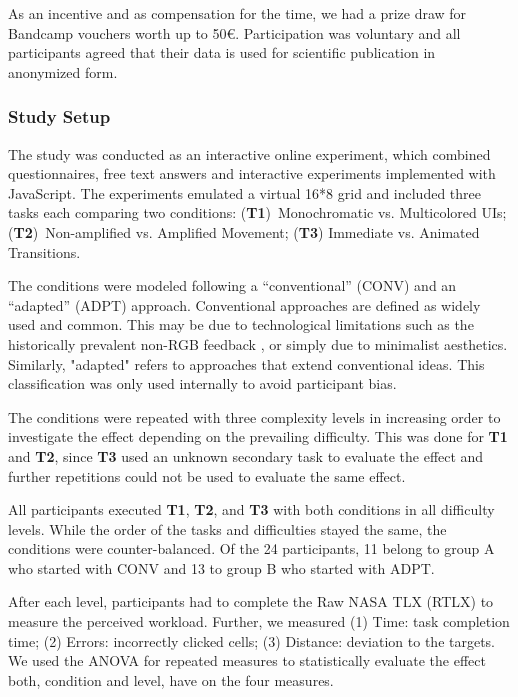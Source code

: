 \documentclass[sigconf]{nimeart}
\begin{document}
As an incentive and as compensation for the time, we had a prize draw for Bandcamp vouchers worth up to 50€. Participation was voluntary and all participants agreed that their data is used for scientific publication in anonymized form.

\subsubsection{Study Setup}\label{study-setup}

The study was conducted as an interactive online experiment, which combined questionnaires, free text answers and interactive experiments implemented with JavaScript. The experiments emulated a virtual 16*8 grid and included three tasks each comparing two conditions: (\textbf{T1})~Monochromatic vs. Multicolored UIs; (\textbf{T2})~Non-amplified vs. Amplified Movement; (\textbf{T3}) Immediate vs. Animated Transitions.

The conditions were modeled following a ``conventional'' (CONV) and an ``adapted'' (ADPT) approach. Conventional approaches are defined as widely used and common. This may be due to technological limitations such as the historically prevalent non-RGB feedback \cite{Rossmy2021Musical}, or simply due to minimalist aesthetics. Similarly, "adapted" refers to approaches that extend conventional ideas. This classification was only used internally to avoid participant bias.

The conditions were repeated with three complexity levels in increasing order to investigate the effect depending on the prevailing difficulty. This was done for \textbf{T1} and \textbf{T2}, since \textbf{T3} used an unknown secondary task to evaluate the effect and further repetitions could not be used to evaluate the same effect.

All participants executed \textbf{T1}, \textbf{T2}, and \textbf{T3} with both conditions in all difficulty levels. While the order of the tasks and difficulties stayed the same, the conditions were counter-balanced. Of the 24 participants, 11 belong to group A who started with CONV and 13 to group B who started with ADPT.

After each level, participants had to complete the Raw NASA TLX (RTLX) \cite{hart2006nasa} to measure the perceived workload. Further, we measured (1) Time: task completion time; (2) Errors: incorrectly clicked cells; (3) Distance: deviation to the targets. We used the ANOVA for repeated measures to statistically evaluate the effect both, condition and level, have on the four measures.
\end{document}
